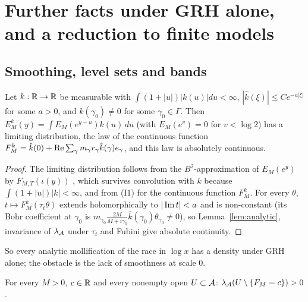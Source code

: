 \section{Further facts under GRH alone, and a reduction to finite models}\label{sec:reduction}

\subsection{Smoothing, level sets and bands}

\begin{theorem}\label{thm:smooth}
Let $k:\mathbb R\to\mathbb R$ be measurable with $\int(1+|u|)|k(u)|du<\infty$, $|\hat k(\xi)|\le Ce^{-a|\xi|}$ for some $a>0$, and $\hat k(\gamma_0)\ne0$ for some $\gamma_0\in\Gamma$. Then $E^k_M(y)=\int E_M(e^{y-u})k(u)\,du$ (with $E_M(e^v)=0$ for $v<\log2$) has a limiting distribution, the law of the continuous function $F^k_M=\hat k(0)+\operatorname{Re}\sum_\gamma m_\gamma r_\gamma\hat k(\gamma)e_\gamma$, and this law is absolutely continuous.
\end{theorem}

\begin{proof}
The limiting distribution follows from the $B^2$-approximation of $E_M(e^y)$ by $F_{M,T}(\iota(y))$ \cite[Theorem~1.3(a)]{GO}, which survives convolution with $k$ because $\int(1+|u|)|k|<\infty$, and from (I1) for the continuous function $F^k_M$. For every $\theta$, $t\mapsto F^k_M(\tau_t\theta)$ extends holomorphically to $|\operatorname{Im} t|<a$ and is non-constant (its Bohr coefficient at $\gamma_0$ is $m_{\gamma_0}\frac{2M}{M+i\gamma_0}\hat k(\gamma_0)\theta_{\gamma_0}\ne0$), so Lemma~\ref{lem:analytic}, invariance of $\lambda_{\mathcal A}$ under $\tau_t$ and Fubini give absolute continuity.
\end{proof}

So every analytic mollification of the race in $\log x$ has a density under GRH alone; the obstacle is the lack of smoothness at scale $0$.

\begin{proposition}\label{prop:interior}
For every $M>0$, $c\in\mathbb R$ and every nonempty open $U\subset\mathcal A$: $\lambda_{\mathcal A}(U\setminus\{F_M=c\})>0$.
\end{proposition}

